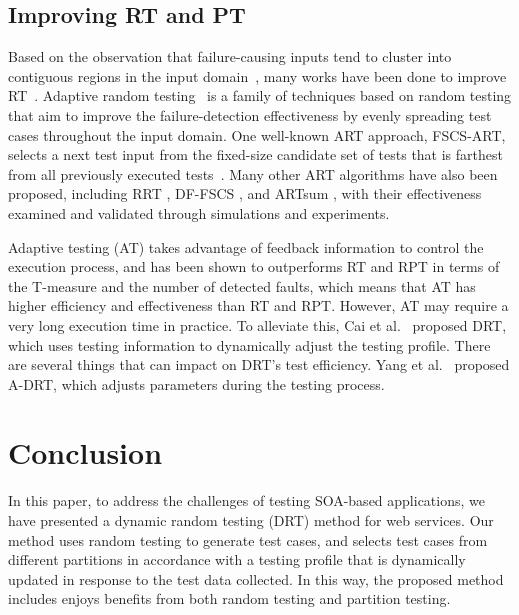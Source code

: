 \documentclass[10pt,journal,compsoc]{IEEEtran}
\begin{document}
\subsection{Improving RT and PT}
\label{sec:relatedworkRT}

Based on the observation that failure-causing inputs tend to cluster into contiguous regions in the input domain~\cite{Ammann88, Finelli91}, many works have been done to improve RT~\cite{cai2009random, chen2010adaptive}.
Adaptive random testing~\cite{chen2010adaptive} is a family of techniques based on random testing that aim to improve the failure-detection effectiveness by evenly spreading test cases throughout the input domain.
One well-known ART approach, FSCS-ART, selects a next test input from the fixed-size candidate set of tests that is farthest from all previously executed tests~\cite{chen2004adaptive}.
Many other ART algorithms have also been proposed, including RRT \cite{chan2002restricted, chan2006restricted}, DF-FSCS \cite{mao2017out}, and ARTsum \cite{barus2016cost}, with their effectiveness examined and  validated through simulations and experiments.

Adaptive testing (AT) \cite{Cai07, hu2005case, hu2009improved} takes advantage of feedback information to control the execution process, and has been shown to outperforms RT and RPT in terms of the T-measure and the number of detected faults, which means that AT has higher efficiency and effectiveness than RT and RPT.
However, AT may require a very long execution time in practice.
To alleviate this, Cai et al.~\cite{cai2009random} proposed DRT, which uses testing information to dynamically adjust the testing profile.
There are several things that can impact on DRT's test efficiency.
Yang et al.~\cite{Yang2014Dynamic} proposed A-DRT, which adjusts parameters during the testing process.

\section{Conclusion}
\label{sec:conclusion}

In this paper, to address the challenges of testing SOA-based applications, we have presented a dynamic random testing (DRT) method for web services.
Our method uses random testing to generate test cases, and selects test cases from different partitions in accordance with a testing profile that is dynamically updated in response to the test data collected.
In this way, the proposed method includes enjoys benefits from both random testing and partition testing.
\end{document}
